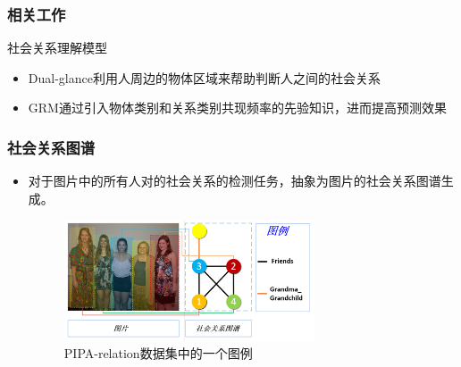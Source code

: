 \documentclass[UTF8]{beamer}
\begin{document}
\begin{frame}
    \frametitle{相关工作}
     \begin{block}{社会关系理解模型}
        \begin{itemize}
            \item Dual-glance\cite{li2017dual-glance}利用人周边的物体区域来帮助判断人之间的社会关系
            \item GRM\cite{wang2018deep}通过引入物体类别和关系类别共现频率的先验知识，进而提高预测效果
        \end{itemize}
     \end{block}
\end{frame}

\begin{frame}
\frametitle{社会关系图谱}
    \begin{itemize}
       \item 对于图片中的所有人对的社会关系的检测任务，抽象为图片的社会关系图谱生成。
       \begin{figure}
        \centering
            \includegraphics[width=0.70\textwidth]{images/example-3.png}
            \caption{PIPA-relation\cite{sun2017a}数据集中的一个图例}
            \label{fig:example}
        \end{figure}
    \end{itemize}
\end{frame}
\end{document}
